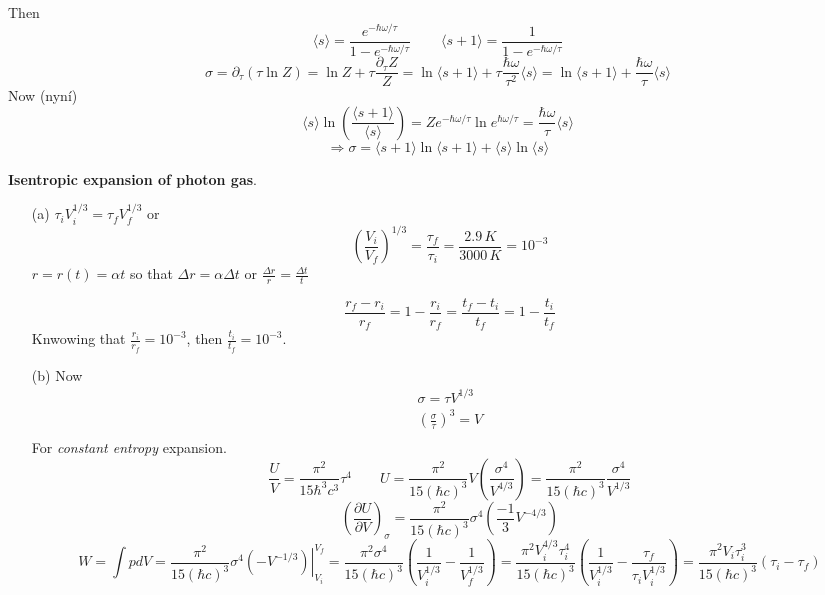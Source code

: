 \documentclass[twoside]{amsart}
\theoremstyle{plain}
\theoremstyle{definition}
\newcommand{\solutionhead}[1]
  {
   \noindent{\small\bf Solution #1.}
   }
\begin{document}
Then 
\[
\langle s \rangle = \frac{ e^{-\hbar \omega/\tau} }{ 1 - e^{-\hbar \omega/\tau} } \quad \quad \, \langle s +1 \rangle  = \frac{1}{1- e^{-\hbar \omega/\tau } }
\]
\[
\sigma = \partial_{\tau} (\tau \ln{Z})  = \ln{Z} + \tau \frac{ \partial_{\tau} Z}{ Z} = \ln{ \langle s + 1 \rangle } + \tau \frac{\hbar \omega}{\tau^2} \langle s \rangle = \ln{ \langle s + 1 \rangle } + \frac{\hbar \omega }{\tau } \langle s \rangle
\]
Now (nyn\'{i})
\[
\langle s \rangle \ln{ \left( \frac{ \langle s  +1 \rangle }{ \langle s  \rangle } \right) } = Z e^{-\hbar \omega/\tau } \ln{ e^{ \hbar \omega/\tau } } = \frac{ \hbar \omega}{\tau} \langle s \rangle 
\]
\[
\Longrightarrow \boxed{ \sigma = \langle s + 1 \rangle \ln{ \langle s + 1 \rangle } + \langle s \rangle \ln{ \langle s \rangle } }
\]





\solutionhead{18} \textbf{Isentropic expansion of photon gas}. \begin{itemize}
\item[(a)] $\tau_i V_i^{1/3} = \tau_f V_f^{1/3}$ or 
\[
\left( \frac{V_i}{V_f} \right)^{1/3} = \frac{\tau_f}{\tau_i} = \frac{2.9 \, K}{ 3000 \, K } = 10^{-3}
\]
$r = r(t) = \alpha t$ so that $\Delta r = \alpha \Delta t$ or $\frac{\Delta r}{r} = \frac{\Delta t}{t}$

\[
\frac{ r_f - r_i }{r_f} = 1 - \frac{r_i}{r_f} = \frac{t_f - t_i}{t_f}= 1 - \frac{t_i}{t_f} 
\]
Knwowing that $\frac{r_i}{r_f} = 10^{-3}$, then $\frac{t_i}{t_f} = 10^{-3}$.  
\item[(b)] Now
\[
\begin{aligned}
  \sigma = \tau V^{1/3} \\ 
  \left( \frac{ \sigma}{\tau} \right)^3 = V \\ 
\end{aligned}
\]
For \emph{constant entropy} expansion.  
\[
\frac{U}{V} = \frac{\pi^2 }{ 15 \hbar^3 c^3 } \tau^4 \quad \quad U = \frac{\pi^2 }{ 15 (\hbar c)^3 } V \left( \frac{\sigma^4}{ V^{4/3} } \right) = \frac{\pi^2 }{15 ( \hbar c)^3 } \frac{\sigma^4 }{ V^{1/3} } 
\]
\[
\left( \frac{ \partial U}{ \partial V} \right)_{\sigma} = \frac{\pi^2 }{15 (\hbar c)^3 } \sigma^4 \left( \frac{-1}{3} V^{-4/3} \right)
\]
\[
W = \int p dV  = \frac{\pi^2 }{15(\hbar c)^3 } \sigma^4 \left. (-V^{-1/3} ) \right|_{V_i}^{V_f} = \frac{\pi^2 \sigma^4 }{ 15 (\hbar c)^3 } \left( \frac{1}{V_i^{1/3}} - \frac{1}{V_f^{1/3}} \right) = \frac{\pi^2 V_i^{4/3} \tau_i^4 }{15 (\hbar c)^3 } \left( \frac{1}{V_i^{1/3}} - \frac{\tau_f}{\tau_i V_i^{1/3} } \right) = \frac{\pi^2 V_i \tau_i^3}{ 15(\hbar c)^3 } (\tau_i - \tau_f)
\]
\end{itemize}
\end{document}
